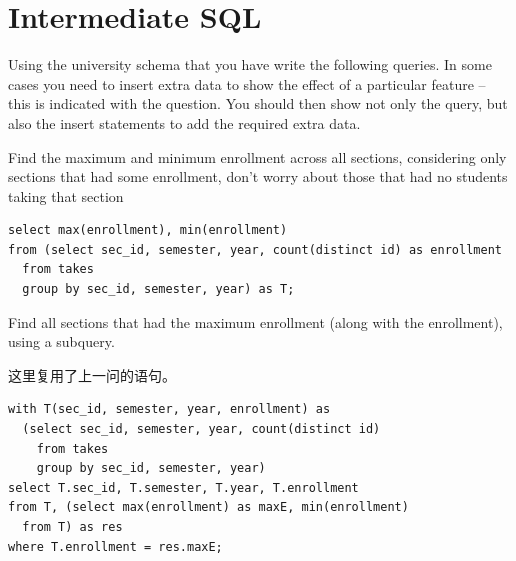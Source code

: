 \documentclass[logo,reportComp]{thesis}
\begin{document}
\setcounter{question}{0}
\section{Intermediate SQL}
Using the university schema that you have write the following queries. In some cases you need to insert extra data to show the effect of a particular feature -- this is indicated with the question. You should then show not only the query, but also the insert statements to add the required extra data.

\begin{question}
\normalfont 
Find the maximum and minimum enrollment across all sections, considering only sections that had some enrollment, don't worry about those that had no students taking that section
\end{question}
\begin{answer}\mbox{}\par
\begin{lstlisting}
select max(enrollment), min(enrollment)
from (select sec_id, semester, year, count(distinct id) as enrollment
  from takes
  group by sec_id, semester, year) as T;
\end{lstlisting}
\end{answer}

\begin{question}
\normalfont 
Find all sections that had the maximum enrollment (along with the enrollment), using a subquery.
\end{question}
\begin{answer}这里复用了上一问的语句。
\begin{lstlisting}
with T(sec_id, semester, year, enrollment) as
  (select sec_id, semester, year, count(distinct id)
    from takes
    group by sec_id, semester, year)
select T.sec_id, T.semester, T.year, T.enrollment
from T, (select max(enrollment) as maxE, min(enrollment)
  from T) as res
where T.enrollment = res.maxE;
\end{lstlisting}
\end{answer}
\end{document}
